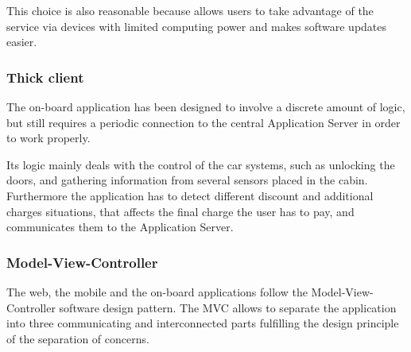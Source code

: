 This choice is also reasonable because allows users to take advantage of the service via devices with limited computing power and makes software updates easier.

\subsubsection{Thick client}
The on-board application has been designed to involve a discrete amount of logic, but still requires a periodic connection to the central Application Server in order to work properly.

Its logic mainly deals with the control of the car systems, such as unlocking the doors, and gathering information from several sensors placed in the cabin. Furthermore the application has to detect different discount and additional charges situations, that affects the final charge the user has to pay, and communicates them to the Application Server.

\subsubsection{Model-View-Controller}
The web, the mobile and the on-board applications follow the Model-View-Controller software design pattern. The MVC allows to separate the application into three communicating and interconnected parts fulfilling the design principle of the separation of concerns.
